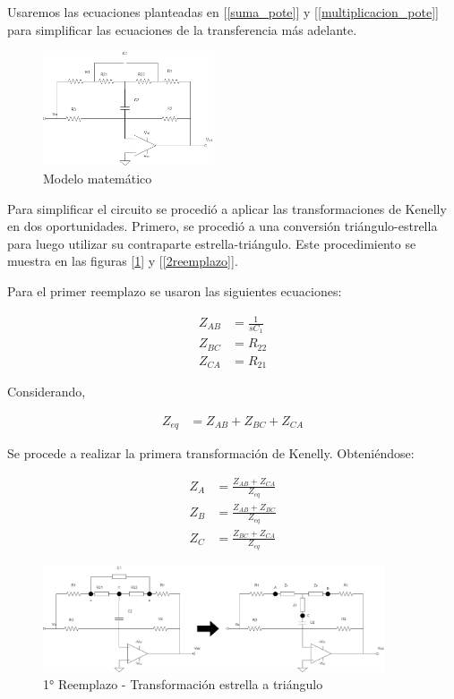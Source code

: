 Usaremos las ecuaciones planteadas en [\ref{suma_pote}] y [\ref{multiplicacion_pote}] para 
simplificar las ecuaciones de la transferencia más adelante.


\begin{figure}[H]
	\centering
	\includegraphics[width=0.45\textwidth]{../Ejercicio4-EcualizadorDeFase/Informe/EcSinPot.png}
	\caption{Modelo matemático}
\end{figure}
Para simplificar el circuito se procedió a aplicar las transformaciones 
de Kenelly en dos oportunidades. Primero, se procedió a una conversión 
triángulo-estrella para luego utilizar su contraparte estrella-triángulo. 
Este procedimiento  se muestra en las figuras [\ref{1reemplazo}]
  y [\ref{2reemplazo}]. \par 
Para el primer reemplazo se usaron las siguientes ecuaciones:

\begin{align*}
		Z_{AB} &= \frac{1}{sC_1} \\ 
		Z_{BC} &= R_{22} \\ 
		Z_{CA} &= R_{21}
\end{align*}
\vspace{2mm}

Considerando,

\begin{align*}
	Z_{eq} &= Z_{AB} + Z_{BC} + Z_{CA}
\end{align*}
\vspace{2mm}

Se procede a realizar la primera transformación de Kenelly.
 Obteniéndose: \par 

\begin{align}
	Z_{A} &= \frac{Z_{AB}+Z_{CA}}{Z_{eq}} \\
	Z_{B} &= \frac{Z_{AB}+Z_{BC}}{Z_{eq}}  \\
	Z_{C} &= \frac{Z_{BC}+Z_{CA}}{Z_{eq}} 
\end{align}
\vspace{2mm}

\begin{figure}[H]

	\centering
	\includegraphics[width=0.9\textwidth]{../Ejercicio4-EcualizadorDeFase/Informe/1cambioEstrella.png}
	\caption{1° Reemplazo - Transformación estrella a triángulo}
	\label{1reemplazo} 
\end{figure}


